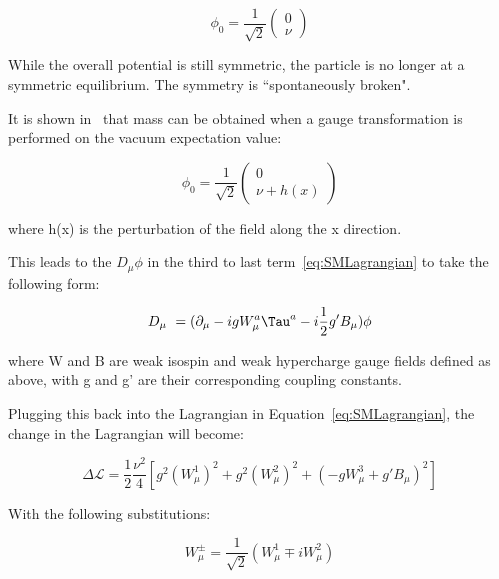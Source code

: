 {\begin{equation}
    \phi_{0} = \frac{1}{\sqrt{2}}
    \begin{pmatrix}
        0\\
        \nu
    \end{pmatrix}
\end{equation}

While the overall potential is still symmetric, the particle is no longer at a symmetric equilibrium. The symmetry is ``spontaneously broken". 

It is shown in~\cite{peskin2018introduction} that mass can be obtained when a gauge transformation is performed on the vacuum expectation value:

\begin{equation}
    \phi_{0} = \frac{1}{\sqrt{2}}
    \begin{pmatrix}
        0\\
        \nu+h(x)
    \end{pmatrix}
\end{equation}

where h(x) is the perturbation of the field along the x direction.

This leads to the $D_{\mu} \phi$ in the third to last term~\ref{eq:SMLagrangian} to take the following form:

\begin{equation}
    D_{\mu}\ = (\partial_{\mu}- ig W_{\mu}^{a}\Tau^{a} - i\frac{1}{2}g' B_{\mu}) \phi
\end{equation}

where W and B are weak isospin and weak hypercharge gauge fields defined as above, with g and g' are their corresponding coupling constants. %

Plugging this back into the Lagrangian in Equation~\ref{eq:SMLagrangian}, the change in the Lagrangian will become:

\begin{equation}
    \Delta \mathcal{L} = \frac{1}{2} \frac{\nu^{2}}{4}[g^{2}(W^{1}_{\mu})^2 + g^{2}(W_{\mu}^{2})^{2} + (-g W_{\mu}^{3}+ g'B_{\mu})^2]
\end{equation}

With the following substitutions:

\begin{equation}
    W^{\pm}_{\mu} = \frac{1}{\sqrt{2}}(W_{\mu}^{1} \mp iW^{2}_{\mu}) 
\end{equation}

}
